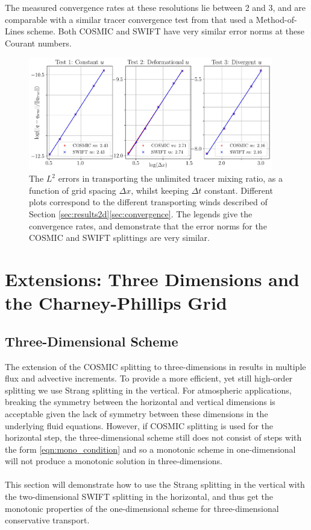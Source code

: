 \documentclass{ametsocV6.1}
\begin{document}
The measured convergence rates at these resolutions lie between 2 and 3, and are comparable with a similar tracer convergence test from \citet{bendall2023solution} that used a Method-of-Lines scheme.
Both COSMIC and SWIFT have very similar error norms at these Courant numbers.
\begin{figure}[h!]
\centering
\includegraphics[width=0.95\textwidth]{fig_6_convergence.jpg}
\caption{The $L^2$ errors in transporting the unlimited tracer mixing ratio, as a function of grid spacing $\Delta x$, whilst keeping $\Delta t$ constant.
Different plots correspond to the different transporting winds described of Section \ref{sec:results2d}\ref{sec:convergence}.
The legends give the convergence rates, and demonstrate that the error norms for the COSMIC and SWIFT splittings are very similar.
}
\label{fig:convergence_const_dt}
\end{figure}

\section{Extensions: Three Dimensions and the Charney-Phillips Grid} \label{sec:3D_CP}
\subsection{Three-Dimensional Scheme} \label{sec:3D}
The extension of the COSMIC splitting to three-dimensions in \cite{leonard1996cosmic} results in multiple flux and advective increments.
To provide a more efficient, yet still high-order splitting we use Strang splitting \citep{strang1968spltting} in the vertical.
For atmospheric applications, breaking the symmetry between the horizontal and vertical dimensions is acceptable given the lack of symmetry between these dimensions in the underlying fluid equations.
However, if COSMIC splitting is used for the horizontal step, the three-dimensional scheme still does not consist of steps with the form \eqref{eqn:mono_condition} and so a monotonic scheme in one-dimensional will not produce a monotonic solution in three-dimensions.
\\
\\
This section will demonstrate how to use the Strang splitting in the vertical with the two-dimensional SWIFT splitting in the horizontal, and thus get the monotonic properties of the one-dimensional scheme for three-dimensional conservative transport.
\end{document}

